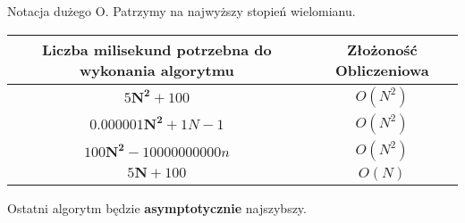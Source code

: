 \documentclass[kslide.tex]{subfiles}
\begin{document}
\begin{frame}{Notacja dużego O.}
    Patrzymy na najwyższy stopień wielomianu.

    \begin{center}
        \begin{tabular}{ |c | c | } 
        \hline
        Liczba milisekund potrzebna do wykonania algorytmu & Złożoność Obliczeniowa \\ 
        \hline 
        $5\mathbf{N^2} + 100$ & $O(N^2)$ \\ 
        \hline
        
        $0.000001\mathbf{N^2} + 1N - 1$ & $O(N^2)$ \\ 
        \hline 
        $100\mathbf{N^2} - 10000000000n$ & $O(N^2)$ \\ 
        \hline 
        $5\mathbf{N} + 100$ & $O(N)$ \\ 
        \hline
        \end{tabular}
    \end{center}
    
    Ostatni algorytm będzie \textbf{asymptotycznie} najszybszy.
        
\end{frame}
\end{document}
